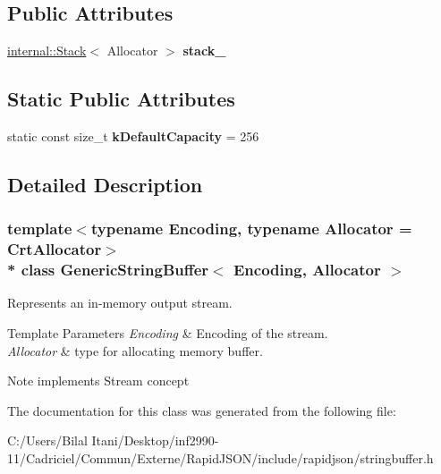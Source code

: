 \subsection*{Public Attributes}
\begin{DoxyCompactItemize}
\item 
\hyperlink{classinternal_1_1_stack}{internal\+::\+Stack}$<$ Allocator $>$ {\bfseries stack\+\_\+}\hypertarget{class_generic_string_buffer_aaef716643febb9de5957dbf8ff904409}{}\label{class_generic_string_buffer_aaef716643febb9de5957dbf8ff904409}

\end{DoxyCompactItemize}
\subsection*{Static Public Attributes}
\begin{DoxyCompactItemize}
\item 
static const size\+\_\+t {\bfseries k\+Default\+Capacity} = 256\hypertarget{class_generic_string_buffer_ae74f9df854dd5a7db4315ef44b016d22}{}\label{class_generic_string_buffer_ae74f9df854dd5a7db4315ef44b016d22}

\end{DoxyCompactItemize}


\subsection{Detailed Description}
\subsubsection*{template$<$typename Encoding, typename Allocator = Crt\+Allocator$>$\\*
class Generic\+String\+Buffer$<$ Encoding, Allocator $>$}

Represents an in-\/memory output stream. 


\begin{DoxyTemplParams}{Template Parameters}
{\em Encoding} & Encoding of the stream. \\
\hline
{\em Allocator} & type for allocating memory buffer. \\
\hline
\end{DoxyTemplParams}
\begin{DoxyNote}{Note}
implements Stream concept 
\end{DoxyNote}


The documentation for this class was generated from the following file\+:\begin{DoxyCompactItemize}
\item 
C\+:/\+Users/\+Bilal Itani/\+Desktop/inf2990-\/11/\+Cadriciel/\+Commun/\+Externe/\+Rapid\+J\+S\+O\+N/include/rapidjson/stringbuffer.\+h\end{DoxyCompactItemize}
